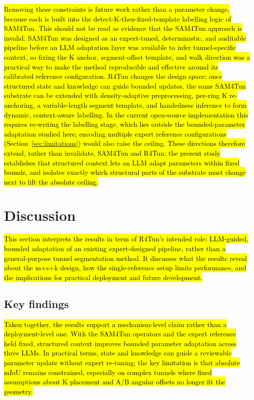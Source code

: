 \documentclass[a4paper,fleqn]{cas-dc}
\begin{document}
{\hl{Removing these constraints is future work rather than a parameter change, because each is built into the detect-K-then-fixed-template labelling logic of SAM4Tun. This should not be read as evidence that the SAM4Tun approach is invalid. SAM4Tun was designed as an expert-tuned, deterministic, and auditable pipeline before an LLM adaptation layer was available to infer tunnel-specific context, so fixing the K anchor, segment-offset template, and walk direction was a practical way to make the method reproducible and effective around its calibrated reference configuration. R4Tun changes the design space: once structured state and knowledge can guide bounded updates, the same SAM4Tun substrate can be extended with density-adaptive preprocessing, per-ring K re-anchoring, a variable-length segment template, and handedness inference to form dynamic, context-aware labelling. In the current open-source implementation this requires re-writing the labelling stage, which lies outside the bounded-parameter adaptation studied here; encoding multiple expert reference configurations (Section~\ref{sec:limitations}) would also raise the ceiling. These directions therefore extend, rather than invalidate, SAM4Tun and R4Tun: the present study establishes that structured context lets an LLM adapt parameters within fixed bounds, and isolates exactly which structural parts of the substrate must change next to lift the absolute ceiling.}



\section{Discussion}\label{sec:discussion}

\hl{This section interprets the results in term of R4Tun's intended role: LLM-guided, bounded adaptation of an existing expert-designed pipeline, rather than a general-purpose tunnel segmentation method. It discusses what the results reveal about the m+s+k design, how the single-reference setup limits performance, and the implications for practical deployment and future development.}

\subsection{Key findings}

\hl{Taken together, the results support a mechanism-level claim rather than a deployment-level one. With the SAM4Tun operators and the expert reference held fixed, structured context improves bounded parameter adaptation across three LLMs. In practical terms, state and knowledge can guide a reviewable parameter update without expert re-tuning; the key limitation is that absolute mIoU remains constrained, especially on complex tunnels where fixed assumptions about K placement and A/B angular offsets no longer fit the geometry.}

}
\end{document}
